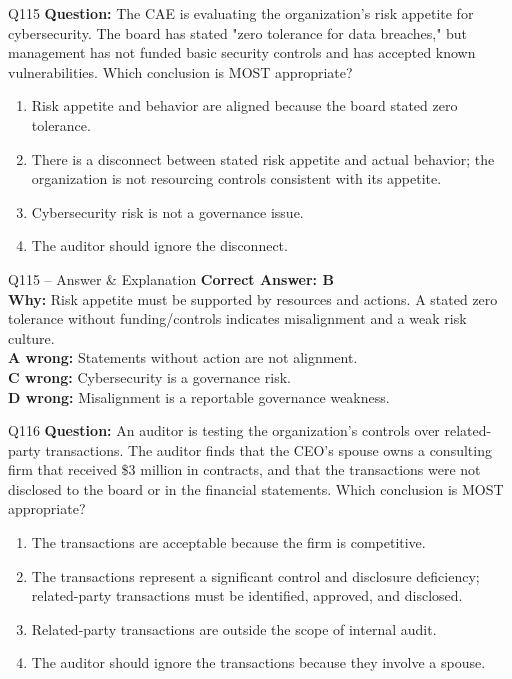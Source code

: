 \documentclass[aspectratio=169,10pt]{beamer}
\begin{document}
	\begin{frame}[t]{Q115}
		\small
		\textbf{Question:} The CAE is evaluating the organization's risk appetite for cybersecurity. The board has stated "zero tolerance for data breaches," but management has not funded basic security controls and has accepted known vulnerabilities. Which conclusion is MOST appropriate?
		\begin{enumerate}[label=\Alph*.,itemsep=1pt,topsep=2pt]
			\item Risk appetite and behavior are aligned because the board stated zero tolerance.
			\item There is a disconnect between stated risk appetite and actual behavior; the organization is not resourcing controls consistent with its appetite.
			\item Cybersecurity risk is not a governance issue.
			\item The auditor should ignore the disconnect.
		\end{enumerate}
	\end{frame}
	
	\begin{frame}[t]{Q115 -- Answer \& Explanation}
		\small
		\textbf{Correct Answer: B} \\[4pt]
		\textbf{Why:} Risk appetite must be supported by resources and actions. A stated zero tolerance without funding/controls indicates misalignment and a weak risk culture. \\[4pt]
		\textbf{A wrong:} Statements without action are not alignment. \\[2pt]
		\textbf{C wrong:} Cybersecurity is a governance risk. \\[2pt]
		\textbf{D wrong:} Misalignment is a reportable governance weakness.
	\end{frame}
	
	\begin{frame}[t]{Q116}
		\small
		\textbf{Question:} An auditor is testing the organization's controls over related-party transactions. The auditor finds that the CEO's spouse owns a consulting firm that received \$3 million in contracts, and that the transactions were not disclosed to the board or in the financial statements. Which conclusion is MOST appropriate?
		\begin{enumerate}[label=\Alph*.,itemsep=1pt,topsep=2pt]
			\item The transactions are acceptable because the firm is competitive.
			\item The transactions represent a significant control and disclosure deficiency; related-party transactions must be identified, approved, and disclosed.
			\item Related-party transactions are outside the scope of internal audit.
			\item The auditor should ignore the transactions because they involve a spouse.
		\end{enumerate}
	\end{frame}
	
\end{document}
